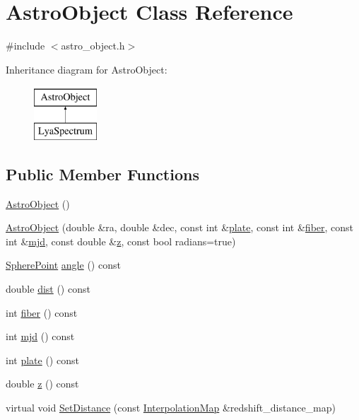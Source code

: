 \hypertarget{class_astro_object}{\section{Astro\-Object Class Reference}
\label{class_astro_object}
}


{\ttfamily \#include $<$astro\-\_\-object.\-h$>$}

Inheritance diagram for Astro\-Object\-:\begin{figure}[H]
\begin{center}
\leavevmode
\includegraphics[height=2.000000cm]{class_astro_object}
\end{center}
\end{figure}
\subsection*{Public Member Functions}
\begin{DoxyCompactItemize}
\item 
\hyperlink{class_astro_object_a1802093595c886ac1e0f972829382c61}{Astro\-Object} ()
\item 
\hyperlink{class_astro_object_af5ff221d0cc120501f4e2c8b1c5ccfec}{Astro\-Object} (double \&ra, double \&dec, const int \&\hyperlink{class_astro_object_a2ebf8d94adab8f2f828a9209b1dc795e}{plate}, const int \&\hyperlink{class_astro_object_ab10c73e293654f21e73fcc344cf7d866}{fiber}, const int \&\hyperlink{class_astro_object_a4c54c4d7ad2f41eba2ff759c4fa3689b}{mjd}, const double \&\hyperlink{class_astro_object_a48a7db2aa513109f6cb662a44c36b3d3}{z}, const bool radians=true)
\item 
\hyperlink{class_sphere_point}{Sphere\-Point} \hyperlink{class_astro_object_a82d16c84459cdaab764205749660130b}{angle} () const 
\item 
double \hyperlink{class_astro_object_acb0a49a6cf2dc41076063a3b15b59b0f}{dist} () const 
\item 
int \hyperlink{class_astro_object_ab10c73e293654f21e73fcc344cf7d866}{fiber} () const 
\item 
int \hyperlink{class_astro_object_a4c54c4d7ad2f41eba2ff759c4fa3689b}{mjd} () const 
\item 
int \hyperlink{class_astro_object_a2ebf8d94adab8f2f828a9209b1dc795e}{plate} () const 
\item 
double \hyperlink{class_astro_object_a48a7db2aa513109f6cb662a44c36b3d3}{z} () const 
\item 
virtual void \hyperlink{class_astro_object_a7addd0f108191b1ca35db6e16e45ed72}{Set\-Distance} (const \hyperlink{class_interpolation_map}{Interpolation\-Map} \&redshift\-\_\-distance\-\_\-map)
\end{DoxyCompactItemize}
